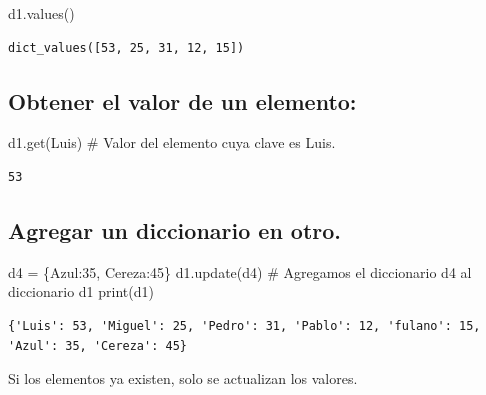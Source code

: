 \documentclass[
  spanish,
  letterpaper,
]{scrbook}
\newenvironment{Shaded}{\begin{snugshade}}{\end{snugshade}}
\newcommand{\BuiltInTok}[1]{\textcolor[rgb]{0.00,0.23,0.31}{#1}}
\newcommand{\CommentTok}[1]{\textcolor[rgb]{0.37,0.37,0.37}{#1}}
\newcommand{\DecValTok}[1]{\textcolor[rgb]{0.68,0.00,0.00}{#1}}
\newcommand{\NormalTok}[1]{\textcolor[rgb]{0.00,0.23,0.31}{#1}}
\newcommand{\OperatorTok}[1]{\textcolor[rgb]{0.37,0.37,0.37}{#1}}
\newcommand{\StringTok}[1]{\textcolor[rgb]{0.13,0.47,0.30}{#1}}
\theoremstyle{definition}
\theoremstyle{remark}
\begin{document}
\begin{Shaded}
\begin{Highlighting}[]
\NormalTok{d1.values() }
\end{Highlighting}
\end{Shaded}

\begin{verbatim}
dict_values([53, 25, 31, 12, 15])
\end{verbatim}

\subsection{Obtener el valor de un
elemento:}\label{obtener-el-valor-de-un-elemento}

\begin{Shaded}
\begin{Highlighting}[]
\NormalTok{d1.get(}\StringTok{\textquotesingle{}Luis\textquotesingle{}}\NormalTok{) }\CommentTok{\# Valor del elemento cuya clave es \textasciigrave{}\textquotesingle{}Luis\textquotesingle{}\textasciigrave{}.}
\end{Highlighting}
\end{Shaded}

\begin{verbatim}
53
\end{verbatim}

\subsection{Agregar un diccionario en
otro.}\label{agregar-un-diccionario-en-otro.}

\begin{Shaded}
\begin{Highlighting}[]
\NormalTok{d4 }\OperatorTok{=}\NormalTok{ \{}\StringTok{\textquotesingle{}Azul\textquotesingle{}}\NormalTok{:}\DecValTok{35}\NormalTok{, }\StringTok{\textquotesingle{}Cereza\textquotesingle{}}\NormalTok{:}\DecValTok{45}\NormalTok{\}}
\NormalTok{d1.update(d4) }\CommentTok{\# Agregamos el diccionario d4 al diccionario d1}
\BuiltInTok{print}\NormalTok{(d1)}
\end{Highlighting}
\end{Shaded}

\begin{verbatim}
{'Luis': 53, 'Miguel': 25, 'Pedro': 31, 'Pablo': 12, 'fulano': 15, 'Azul': 35, 'Cereza': 45}
\end{verbatim}

Si los elementos ya existen, solo se actualizan los valores.
\end{document}
